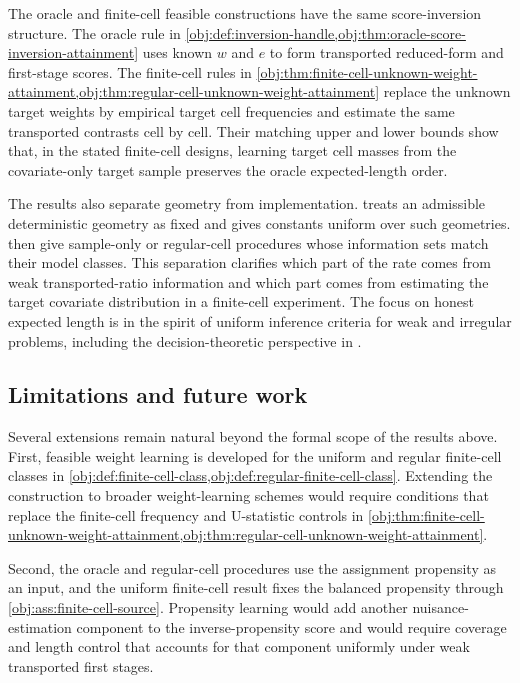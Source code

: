 The oracle and finite-cell feasible constructions have the same score-inversion structure. The oracle rule in \cref{obj:def:inversion-handle,obj:thm:oracle-score-inversion-attainment} uses known \(w\) and \(e\) to form transported reduced-form and first-stage scores. The finite-cell rules in \cref{obj:thm:finite-cell-unknown-weight-attainment,obj:thm:regular-cell-unknown-weight-attainment} replace the unknown target weights by empirical target cell frequencies and estimate the same transported contrasts cell by cell. Their matching upper and lower bounds show that, in the stated finite-cell designs, learning target cell masses from the covariate-only target sample preserves the oracle expected-length order.

The results also separate geometry from implementation.  treats an admissible deterministic geometry as fixed and gives constants uniform over such geometries.  then give sample-only or regular-cell procedures whose information sets match their model classes. This separation clarifies which part of the rate comes from weak transported-ratio information and which part comes from estimating the target covariate distribution in a finite-cell experiment. The focus on honest expected length is in the spirit of uniform inference criteria for weak and irregular problems, including the decision-theoretic perspective in \citet{ArmstrongKolesar2021}.

\subsection{Limitations and future work}

Several extensions remain natural beyond the formal scope of the results above. First, feasible weight learning is developed for the uniform and regular finite-cell classes in \cref{obj:def:finite-cell-class,obj:def:regular-finite-cell-class}. Extending the construction to broader weight-learning schemes would require conditions that replace the finite-cell frequency and U-statistic controls in \cref{obj:thm:finite-cell-unknown-weight-attainment,obj:thm:regular-cell-unknown-weight-attainment}.

Second, the oracle and regular-cell procedures use the assignment propensity as an input, and the uniform finite-cell result fixes the balanced propensity through \cref{obj:ass:finite-cell-source}. Propensity learning would add another nuisance-estimation component to the inverse-propensity score and would require coverage and length control that accounts for that component uniformly under weak transported first stages.

